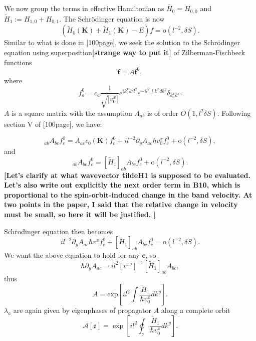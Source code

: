 \documentclass[aps, prb, showpacs, twocolumn, notitlepage, superscriptaddress]{revtex4-1}
\begin{document}
We now group the  terms in effective Hamiltonian as $\tilde{H_0}=H_{0,0}$ and $\tilde{H}_{1}:=H_{1,0}+H_{0,1}$. The Schr\"odinger equation is now
\begin{equation}
(\tilde{H}_{0}(\boldsymbol{K})+\tilde{H}_{1}(\boldsymbol{K})-E)f=\text{o}(l^{-2}, \delta S).
\end{equation}
Similar to what is done in [100page], we seek the solution to the Schr\"odinger equation using superposition\textbf{[strange way to put it]} of Zilberman-Fischbeck functions
\begin{equation}
\boldsymbol{f}=A\boldsymbol{f}^{0},
\end{equation}
where 
\begin{equation}
f_{a}^{0}=c_{a}\frac{1}{\sqrt{|v_0^{x}|}}e^{ik_{0}^{x}k^{y}l^{2}}e^{-il^{2}\int k^{x}dk^{y}}\delta_{k_{0}^{x}k^{x}}.
\end{equation}
$A$ is a square matrix with the assumption $A_{ab}$ is of order $O(1,l^2\delta S)$. Following section V of [100page], we have:
\begin{widetext}
\begin{equation}
[H_{0}(\boldsymbol{K})]_{ab}A_{bc}f_{c}^{0}=A_{ac}\epsilon_0(\boldsymbol{K})f_{c}^{0}+il^{-2}\partial_{y}A_{ac}\hbar v_0^{x}f_{c}^{0}+\text{o}(l^{-2}, \delta S),
\end{equation}
and
\begin{equation}
[\tilde{H}_{1}(\boldsymbol{K})]_{ab}A_{bc}f_{c}^{0}=[\tilde{H}_{1}]_{ab}A_{bc}f_{c}^{0}+\text{o}(l^{-2}, \delta S).
\end{equation}
\textbf{[Let's clarify at what wavevector tildeH1 is supposed to be evaluated. Let's also write out explicitly the next order term in B10, which is proportional to the spin-orbit-induced change in the band velocity. At two points in the paper, I said that the relative change in velocity must be small, so here it will be justified. ]}
\end{widetext}

Sch\"rodinger equation then becomes 
\begin{equation}
il^{-2}\partial_{y}A_{ac}\hbar v^{x}f_{c}^{0}+[\tilde{H}_{1}]_{ab}A_{bc}f_{c}^{0}=\text{o}(l^{-2}, \delta S).
\end{equation}
We want the above equation to hold for any $\mathbf{c}$, so 
\begin{equation}
\hbar\partial_{y}A_{ac}=il^{2}[v^{x\nu}]^{-1}[\tilde{H}_{1}]_{ab}A{}_{bc},
\end{equation}
thus
\begin{equation}
A=\overline{\text{exp}}[il^{2}\int\frac{\tilde{H}_{1}}{\hbar v_0^{x}}dk^{y}].
\end{equation}
$\lambda_{a}$ are again given by eigenphases of propagator $A$ along a complete orbit
\begin{equation}
\mathcal{A}[\mathfrak{o}]=\overline{\exp}[il^{2}\oint_{\mathfrak{o}}\frac{\tilde{H}_{1}}{\hbar v_0^{x}}dk^{y}].
\end{equation}
\end{document}
